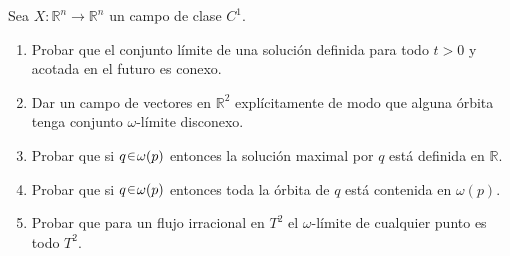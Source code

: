 \begin{ejer}
Sea $X : \mathbb{R}^n \to \mathbb{R}^n$ un campo de clase $C^1$.
\begin{enumerate}[label=(\alph*)]
\item Probar que el conjunto límite de una solución definida para todo $t > 0$ y acotada en el futuro es conexo.

\item Dar un campo de vectores en $\mathbb{R}^2$ explícitamente de modo que alguna órbita tenga conjunto $\omega\text{-límite}$ disconexo.

\item Probar que si $q \en \omega(p)$ entonces la solución maximal por $q$ está definida en $\mathbb{R}$.

\item Probar que si $q \en \omega(p)$ entonces toda la órbita de $q$ está contenida en $\omega(p)$.

\item Probar que para un flujo irracional en $T^2$ el $\omega\text{-límite}$ de cualquier punto es todo $T^2$.
\end{enumerate}
\end{ejer}
